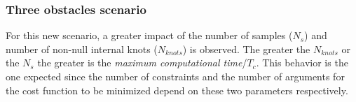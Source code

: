 \subsubsection{Three obstacles scenario}

For this new scenario, a greater impact of the number of samples ($N_s$) and number of non-null internal knots ($N_{knots}$) is observed. The greater the $N_{knots}$ or the $N_s$ the greater is the \textit{maximum computational time}/$T_c$. This behavior is the one expected since the number of constraints and the number of arguments for the cost function to be minimized depend on these two parameters respectively.

